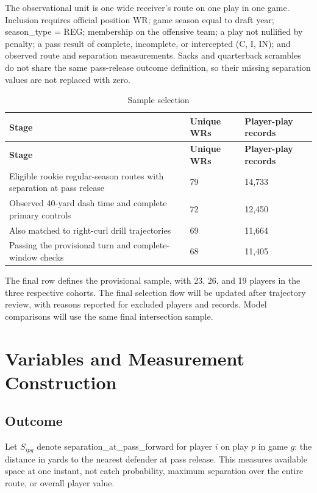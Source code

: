 \documentclass[a4paper,11pt]{article}
\newcommand{\code}[1]{{\small\ttfamily #1}}
\newlength{\tablecontentwidth}
\begin{document}
The observational unit is one wide receiver's route on one play in one game. Inclusion requires official position WR; game season equal to draft year; \code{season\_\allowbreak{}type = REG}; membership on the offensive team; a play not nullified by penalty; a pass result of complete, incomplete, or intercepted (\code{C}, \code{I}, \code{IN}); and observed route and separation measurements. Sacks and quarterback scrambles do not share the same pass-release outcome definition, so their missing separation values are not replaced with zero.

{\small
\begin{longtable}{@{}P{0.6\tablecontentwidth}R{0.19\tablecontentwidth}R{0.21\tablecontentwidth}@{}}
\caption{Sample selection}\label{tab:2}\\
\toprule
\textbf{Stage} & \textbf{Unique WRs} & \textbf{Player-play records} \\
\midrule
\endfirsthead
\toprule
\textbf{Stage} & \textbf{Unique WRs} & \textbf{Player-play records} \\
\midrule
\endhead
\bottomrule
\endlastfoot
Eligible rookie regular-season routes with separation at pass release & 79 & 14,733 \\[.15em]
Observed 40-yard dash time and complete primary controls & 72 & 12,450 \\[.15em]
Also matched to right-curl drill trajectories & 69 & 11,664 \\[.15em]
Passing the provisional turn and complete-window checks & 68 & 11,405 \\[.15em]
\end{longtable}
}

The final row defines the provisional sample, with 23, 26, and 19 players in the three respective cohorts. The final selection flow will be updated after trajectory review, with reasons reported for excluded players and records. Model comparisons will use the same final intersection sample.

\section{Variables and Measurement Construction}

\subsection{Outcome}

Let $S_{ipg}$ denote \code{separation\_\allowbreak{}at\_\allowbreak{}pass\_\allowbreak{}forward} for player $i$ on play $p$ in game $g$: the distance in yards to the nearest defender at pass release. This measures available space at one instant, not catch probability, maximum separation over the entire route, or overall player value.
\end{document}
